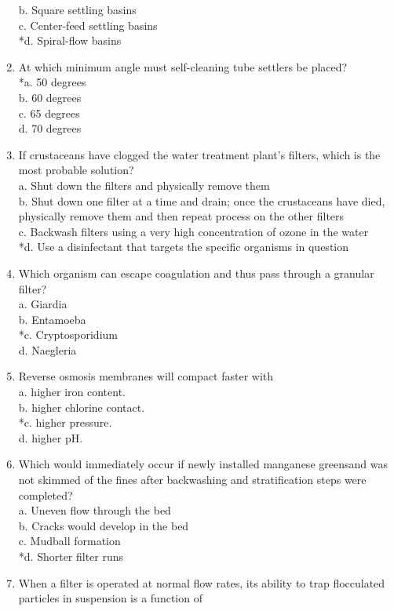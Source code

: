 \begin{enumerate}
b. Square settling basins\\
c. Center-feed settling basins\\
*d. Spiral-flow basins\\
\item At which minimum angle must self-cleaning tube settlers be placed?\\
*a. 50 degrees\\
b. 60 degrees\\
c. 65 degrees\\
d. 70 degrees\\
\item If crustaceans have clogged the water treatment plant's filters, which is the most probable solution?\\
a. Shut down the filters and physically remove them\\
b. Shut down one filter at a time and drain; once the crustaceans have died, physically remove them and then repeat process on the other filters\\
c. Backwash filters using a very high concentration of ozone in the water\\
*d. Use a disinfectant that targets the specific organisms in question\\
\item Which organism can escape coagulation and thus pass through a granular filter?\\
a. Giardia\\
b. Entamoeba\\
*c. Cryptosporidium\\
d. Naegleria\\
\item Reverse osmosis membranes will compact faster with\\
a. higher iron content.\\
b. higher chlorine contact.\\
*c. higher pressure.\\
d. higher pH.\\
\item Which would immediately occur if newly installed manganese greensand was not skimmed of the fines after backwashing and stratification steps were completed?\\
a. Uneven flow through the bed\\
b. Cracks would develop in the bed\\
c. Mudball formation\\
*d. Shorter filter runs \\
\item When a filter is operated at normal flow rates, its ability to trap flocculated particles in suspension is a function of\\

\end{enumerate}
